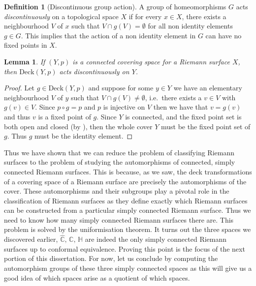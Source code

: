 \documentclass[11pt]{report}
\newtheorem{lemma}[thm]{Lemma}
\theoremstyle{definition}
\newtheorem{defn}[thm]{Definition}
\begin{document}
\begin{defn}[Discontinuous group action]
  A group of homeomorphisms $G$ acts \emph{discontinuously} on a topological space $X$ if for every $x \in X$, there exists a neighbourhood $V$ of $x$ such that $V \cap g(V) = \emptyset$ for all non identity elements $g \in G$. This implies that the action of a non identity element in $G$ can have no fixed points in $X$.
\end{defn}
\begin{lemma}
  If $(Y,p)$ is a connected covering space for a Riemann surface $X$, then $\text{Deck}(Y,p)$ acts discontinuously on $Y$.
\end{lemma}
\begin{proof}
  Let $g \in \text{Deck}(Y,p)$ and suppose for some $y \in Y$ we have an elementary neighbourhood $V$ of $y$ such that $V \cap g(V) \neq \emptyset$, i.e.\ there exists a $v \in V$ with $g(v) \in V$. Since $p \circ g = p$ and $p$ is injective on $V$ then we have that $v=g(v)$ and thus $v$ is a fixed point of $g$. Since $Y$ is connected, and the fixed point set is both open and closed (by \cite[Lemma 4.19.1]{comfun}), then the whole cover $Y$ must be the fixed point set of $g$. Thus $g$ must be the identity element.
\end{proof}
Thus we have shown that we can reduce the problem of classifying Riemann surfaces to the problem of studying the automorphisms of connected, simply connected Riemann surfaces. This is because, as we saw, the deck transformations of a covering space of a Riemann surface are precisely the automorphisms of the cover. These automorphisms and their subgroups play a pivotal role in the classification of Riemann surfaces as they define exactly which Riemann surfaces can be constructed from a particular simply connected Riemann surface. Thus we need to know how many simply connected Riemann surfaces there are. This problem is solved by the uniformisation theorem. It turns out the three spaces we discovered earlier, $\widehat{\mathbb{C}},\, \mathbb{C},\,\mathbb{H}$ are indeed the only simply connected Riemann surfaces up to conformal equivalence. Proving this point is the focus of the next portion of this dissertation. For now, let us conclude by computing the automorphism groups of these three simply connected spaces as this will give us a good idea of which spaces arise as a quotient of which spaces.
\end{document}
